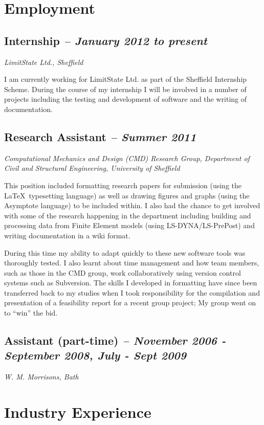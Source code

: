 \documentclass[oneside,a4paper]{article}
\begin{document}
\section*{Employment}

\subsection*{Internship {\it -- January 2012 to present}}
{\it LimitState Ltd., Sheffield}

I am currently working for LimitState Ltd. as part of the Sheffield Internship Scheme. During the course of my internship I will be involved in a number of projects including the testing and development of software and the writing of documentation.

\subsection*{Research Assistant {\it -- Summer 2011}}
{\it Computational Mechanics and Design (CMD) Research Group, Department of Civil and Structural Engineering, University of Sheffield}

This position included formatting research papers for submission (using the \LaTeX~typesetting language) as well as drawing figures and graphs (using the Asymptote language) to be included within. I also had the chance to get involved with some of the research happening in the department including building and processing data from Finite Element models (using LS-DYNA/LS-PrePost) and writing documentation in a wiki format.

During this time my ability to adapt quickly to these new software tools was thoroughly tested. I also learnt about time management and how team members, such as those in the CMD group, work collaboratively using version control systems such as Subversion. The skills I developed in formatting have since been transferred back to my studies when I took responsibility for the compilation and presentation of a feasibility report for a recent group project; My group went on to ``win'' the bid.

\subsection*{Assistant (part-time) {\it -- November 2006 - September 2008, July - Sept 2009}}
{\it W. M. Morrisons, Bath}

\section*{Industry Experience} %
\end{document}
